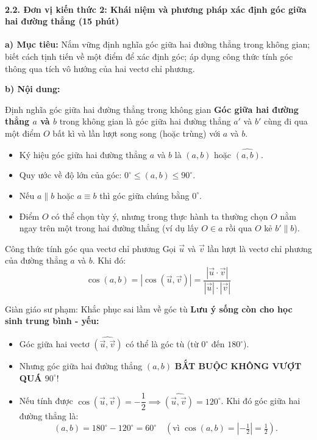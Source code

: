 \documentclass[12pt, a4paper]{article}
\renewcommand{\vec}[1]{\overrightarrow{#1}}
\begin{document}
\paragraph{2.2. Đơn vị kiến thức 2: Khái niệm và phương pháp xác định góc giữa hai đường thẳng (15 phút)}

\noindent \textbf{a) Mục tiêu:}
Nắm vững định nghĩa góc giữa hai đường thẳng trong không gian; biết cách tịnh tiến về một điểm để xác định góc; áp dụng công thức tính góc thông qua tích vô hướng của hai vectơ chỉ phương.

\noindent \textbf{b) Nội dung:}
\begin{pedabox}{Định nghĩa góc giữa hai đường thẳng trong không gian}
\textbf{Góc giữa hai đường thẳng $a$ và $b$} trong không gian là góc giữa hai đường thẳng $a'$ và $b'$ cùng đi qua một điểm $O$ bất kì và lần lượt song song (hoặc trùng) với $a$ và $b$.
\begin{itemize}[leftmargin=0.6cm]
    \item Ký hiệu góc giữa hai đường thẳng $a$ và $b$ là $(a, b)$ hoặc $\widehat{(a, b)}$.
    \item Quy ước về độ lớn của góc: $0^\circ \le (a, b) \le 90^\circ$.
    \item Nếu $a \parallel b$ hoặc $a \equiv b$ thì góc giữa chúng bằng $0^\circ$.
    \item Điểm $O$ có thể chọn tùy ý, nhưng trong thực hành ta thường chọn $O$ nằm ngay trên một trong hai đường thẳng (ví dụ lấy $O \in a$ rồi qua $O$ kẻ $b' \parallel b$).
\end{itemize}
\end{pedabox}

\begin{pedabox}{Công thức tính góc qua vectơ chỉ phương}
Gọi $\vec{u}$ và $\vec{v}$ lần lượt là vectơ chỉ phương của đường thẳng $a$ và $b$. Khi đó:
$$\cos(a, b) = |\cos(\vec{u}, \vec{v})| = \dfrac{|\vec{u} \cdot \vec{v}|}{|\vec{u}| \cdot |\vec{v}|}$$
\end{pedabox}

\begin{scaffoldbox}{Giàn giáo sư phạm: Khắc phục sai lầm về góc tù}
\textbf{Lưu ý sống còn cho học sinh trung bình - yếu:}
\begin{itemize}
    \item Góc giữa hai vectơ $\widehat{(\vec{u}, \vec{v})}$ có thể là góc tù (từ $0^\circ$ đến $180^\circ$).
    \item Nhưng góc giữa hai đường thẳng $(a, b)$ \textbf{BẮT BUỘC KHÔNG VƯỢT QUÁ $90^\circ$}!
    \item Nếu tính được $\cos(\vec{u}, \vec{v}) = -\dfrac{1}{2} \implies \widehat{(\vec{u}, \vec{v})} = 120^\circ$. Khi đó góc giữa hai đường thẳng là:
    $$(a, b) = 180^\circ - 120^\circ = 60^\circ \quad (\text{vì } \cos(a, b) = |-\tfrac{1}{2}| = \tfrac{1}{2}).$$
\end{itemize}
\end{scaffoldbox}
\end{document}
